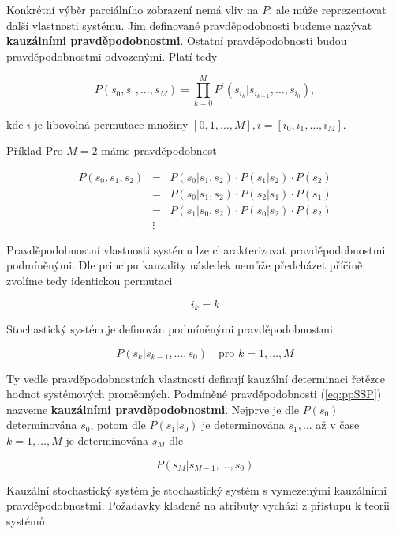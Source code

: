 \tab Konkrétní výběr parciálního zobrazení nemá vliv na $P$, ale může reprezentovat další vlastnosti systému. Jím definované pravděpodobnosti budeme nazývat \textbf{kauzálními pravděpodobnostmi}. Ostatní pravděpodobnosti budou pravděpodobnostmi odvozenými. Platí tedy

\[ P(s_0, s_1,\ldots, s_M) = \prod_{k=0}^M P^i(s_{i_k}|s_{i_{k-1}},\ldots, s_{i_0}), \]

kde $i$ je libovolná permutace množiny $[0,1,\ldots, M], i=[i_0,i_1,\ldots, i_M]$.

\begin{note}{Příklad}
Pro $M=2$ máme pravděpodobnost

\begin{eqnarray*}
P(s_0,s_1,s_2) & = & P(s_0|s_1,s_2)\cdot P(s_1|s_2)\cdot P(s_2)\\
& = & P(s_0|s_1,s_2)\cdot P(s_2|s_1)\cdot P(s_1)\\
& = & P(s_1|s_0,s_2)\cdot P(s_0|s_2)\cdot P(s_2)\\
& \vdots &
\end{eqnarray*}
\end{note}

Pravděpodobnostní vlastnosti systému lze charakterizovat pravděpodobnostmi podmíněnými. Dle principu kauzality následek nemůže předcházet příčině, zvolíme tedy identickou permutaci

\[ i_k=k \]

Stochastický systém je definován podmíněnými pravděpodobnostmi

\begin{equation}
P(s_k|s_{k-1},\ldots,s_0)\quad \text{pro } k=1,\ldots,M\label{eq:ppSSP}
\end{equation}

Ty vedle pravděpodobnostních vlastností definují kauzální determinaci řetězce hodnot systémových proměnných. Podmíněné pravděpodobnosti (\ref{eq:ppSSP}) nazveme \textbf{kauzálními pravděpodobnostmi}. Nejprve je dle $P(s_0)$ determinována $s_0$, potom dle $P(s_1|s_0)$ je determinována $s_1,\ldots$ až v čase $k=1,\ldots,M$ je determinována $s_M$ dle

\[ P(s_M|s_{M-1},\ldots,s_0) \]

Kauzální stochastický systém je stochastický systém s vymezenými kauzálními pravděpodobnostmi. Požadavky kladené na atributy vychází z přístupu k teorii systémů.

